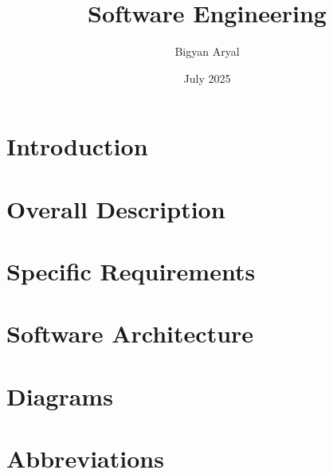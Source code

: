 \documentclass[a4paper,12pt]{report}
\title{Software Engineering}
\author{Bigyan Aryal}
\date{July 2025}
\begin{document}




\tableofcontents
\thispagestyle{empty}
\addtocounter{page}{-1}
\newpage


\chapter{Introduction}%
\label{introduction}%

\newpage

\chapter{Overall Description}%
\label{description}%

\newpage

\chapter{Specific Requirements}%
\label{requirements}

\newpage

\chapter{Software Architecture}%
\label{architecture}


\chapter{Diagrams}%
\label{diagrams}

\newpage

\chapter*{Abbreviations}%
%
\label{abbreviations}%




\end{document}
